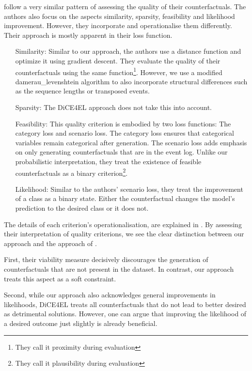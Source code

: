 \documentclass[./../../paper.tex]{subfiles}
\begin{document}
\citeauthor{hsieh_DiCE4ELInterpretingProcess_2021} follow a very similar pattern of assessing the quality of their counterfactuals. The authors also focus on the aspects similarity, sparsity, feasibility and likelihood improvement. However, they incorporate and operationalise them differently. Their approach is mostly apparent in their loss function.

\begin{itemize}
    \item[Similarity:] Similar to our approach, the authors use a distance function and optimize it using gradient descent. They evaluate the quality of their counterfactuals using the same function\footnote{They call it proximity during evaluation}. However, we use a modified \gls{damerau_levenshtein} algorithm to also incorporate structural differences such as the sequence lengths or transposed events.      
    \item[Sparsity:] The DiCE4EL approach does not take this into account.  
    \item[Feasibility:] This quality criterion is embodied by two loss functions: The category loss and scenario loss. The category loss ensures that categorical variables remain categorical after generation. The scenario loss adds emphasis on only generating counterfactuals that are in the event log. Unlike our probabilistic interpretation, they treat the existence of feasible counterfactuals as a binary criterion\footnote{They call it plausibility during evaluation}.   
    \item[Likelihood:] Similar to the authors' scenario loss, they treat the improvement of a class as a binary state. Either the counterfactual changes the model's prediction to the desired class or it does not.
\end{itemize}

The details of each criterion's operationalisation, are explained in \autocite{hsieh_DiCE4ELInterpretingProcess_2021}. By assessing their interpretation of quality criterions, we see the clear distinction between our approach and the approach of \citeauthor{hsieh_DiCE4ELInterpretingProcess_2021}. 

First, their viability measure decisively discourages the generation of counterfactuals that are not present in the dataset. In contrast, our approach treats this aspect as a soft constraint. 

Second, while our approach also acknowledges general improvements in likelihoods, DiCE4EL treats all counterfactuals that do not lead to better desired as detrimental solutions. However, one can argue that improving the likelihood of a desired outcome just slightly is already beneficial.
\end{document}
